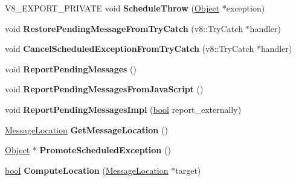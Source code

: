 \begin{DoxyCompactItemize}
V8\+\_\+\+E\+X\+P\+O\+R\+T\+\_\+\+P\+R\+I\+V\+A\+TE void {\bfseries Schedule\+Throw} (\mbox{\hyperlink{classv8_1_1internal_1_1Object}{Object}} $\ast$exception)
\item 
\mbox{\label{classv8_1_1internal_1_1Isolate_a00200c36d3b121d71867d3e0df34d500}} 
void {\bfseries Restore\+Pending\+Message\+From\+Try\+Catch} (v8\+::\+Try\+Catch $\ast$handler)
\item 
\mbox{\label{classv8_1_1internal_1_1Isolate_a6a66af297d92704cc10c86fd28278b18}} 
void {\bfseries Cancel\+Scheduled\+Exception\+From\+Try\+Catch} (v8\+::\+Try\+Catch $\ast$handler)
\item 
\mbox{\label{classv8_1_1internal_1_1Isolate_a9f24ef8c59fe3358df12e3310d03df08}} 
void {\bfseries Report\+Pending\+Messages} ()
\item 
\mbox{\label{classv8_1_1internal_1_1Isolate_a168ada6cf6b8ba4035572097c98f0e24}} 
void {\bfseries Report\+Pending\+Messages\+From\+Java\+Script} ()
\item 
\mbox{\label{classv8_1_1internal_1_1Isolate_a8ab5134190cdd17c5459df24542d15b6}} 
void {\bfseries Report\+Pending\+Messages\+Impl} (\mbox{\hyperlink{classbool}{bool}} report\+\_\+externally)
\item 
\mbox{\label{classv8_1_1internal_1_1Isolate_aa250e39eefa86b3541a9aad23f46a15f}} 
\mbox{\hyperlink{classv8_1_1internal_1_1MessageLocation}{Message\+Location}} {\bfseries Get\+Message\+Location} ()
\item 
\mbox{\label{classv8_1_1internal_1_1Isolate_acf696e718d6b6d349ef51a5d6e890042}} 
\mbox{\hyperlink{classv8_1_1internal_1_1Object}{Object}} $\ast$ {\bfseries Promote\+Scheduled\+Exception} ()
\item 
\mbox{\label{classv8_1_1internal_1_1Isolate_a232c2200770b7f074bc99ea085350e0d}} 
\mbox{\hyperlink{classbool}{bool}} {\bfseries Compute\+Location} (\mbox{\hyperlink{classv8_1_1internal_1_1MessageLocation}{Message\+Location}} $\ast$target)

\end{DoxyCompactItemize}
